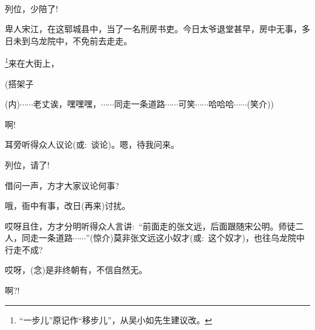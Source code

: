 \newpage\hspace{30pt}~

{%

\subsubsection{\large{}}

{\vspace{5pt}}

{列位，少陪了!}


{卑人宋江，在这郓城县中，当了一名刑房书吏。今日太爷退堂甚早，房中无事，多日未到乌龙院中，不免前去走走。}


\footnote{``一步儿''原记作``移步儿''，从吴小如先生建议改。}{来在大街上，}

{(搭架子

({\akai 内})$\cdots{}\cdots{}$老丈诶，嘿嘿嘿，$\cdots{}\cdots{}$同走一条道路$\cdots{}\cdots{}$可笑$\cdots{}\cdots{}$哈哈哈$\cdots{}\cdots{}$({\hwfs 笑}{\hwfs 介}))}

{啊!}\hspace{30pt}~


{耳旁听得众人议论(或:~谈论)。嗯，待我问来。}

{列位，请了!}

{借问一声，方才大家议论何事?}

{哦，衙中有事，改日(再来)讨扰。}

{哎呀且住，方才分明听得众人言讲:~``前面走的张文远，后面跟随宋公明。师徒二人，同走一条道路$\cdots{}\cdots{}$''(惊{\hwfs 介})莫非张文远这小奴才(或:~这个奴才)，也往乌龙院中行走不成?}

{哎呀，({\akai 念})是非终朝有，不信自然无。}



{啊?!}\hspace{30pt}~

}
